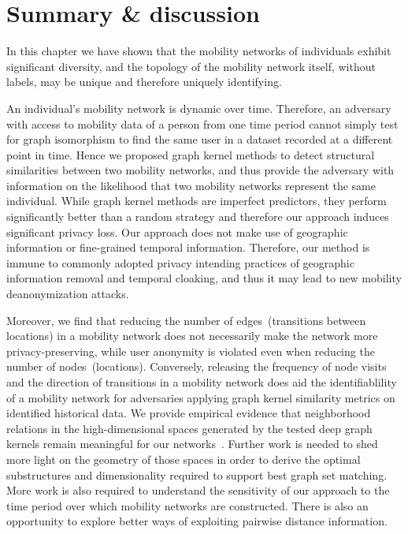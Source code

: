 \section{Summary \& discussion} %

In this chapter we have shown that the mobility networks of individuals exhibit significant diversity, and the topology of the mobility network itself, without labels, may be unique and therefore uniquely identifying.

An individual's mobility network is dynamic over time.
Therefore, an adversary with access to mobility data of a person from one time period cannot simply test for graph isomorphism to find the same user in a dataset recorded at a different point in time.
Hence we proposed graph kernel methods to detect structural similarities between two mobility networks, and thus provide the adversary with information on the likelihood that two mobility networks represent the same individual.
While graph kernel methods are imperfect predictors, they perform significantly better than a random strategy and therefore our approach induces significant privacy loss.
Our approach does not make use of geographic information or fine-grained temporal information. Therefore, our method is immune to commonly adopted privacy intending practices of geographic information removal and temporal cloaking, and thus it may lead to new mobility deanonymization attacks.

Moreover, we find that reducing the number of edges~(transitions between locations) in a mobility network does not necessarily make the network more privacy-preserving, while user anonymity is violated even when reducing the number of nodes~(locations).
Conversely, releasing the frequency of node visits and the direction of transitions in a mobility network does aid the identifiablility of a mobility network for adversaries applying graph kernel similarity metrics on identified historical data.
We provide empirical evidence that neighborhood relations in the high-dimensional spaces generated by the tested deep graph kernels remain meaningful for our networks~\citep{Beyer}.
Further work is needed to shed more light on the geometry of those spaces in order to derive the optimal substructures and dimensionality required to support best graph set matching.
More work is also required to understand the sensitivity of our approach to the time period over which mobility networks are constructed.
There is also an opportunity to explore better ways of exploiting pairwise distance information.

